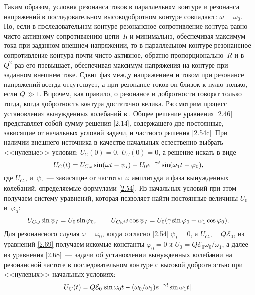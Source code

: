 \documentclass[a4paper,oneside]{book}
\begin{document}
Таким образом, условия резонанса токов в параллельном контуре и резонанса
напряжений в последовательном высокодобротном контуре совпадают:
$\omega=\omega_0$. Но, если в последовательном контуре резонансное сопротивление
контура равно чисто активному сопротивлению цепи~$R$ и минимально, обеспечивая
максимум тока при заданном внешнем напряжении, то в параллельном контуре
резонансное сопротивление контура почти чисто активное, обратно
пропорционально~$R$ и в~$Q^2$ раз его превышает, обеспечивая максимум напряжения
на контуре при заданном внешнем токе. Сдвиг фаз между напряжением и током при
резонансе напряжений всегда отсутствует, а при резонансе токов он близок к нулю
только, если $Q\gg1$. Впрочем, как правило, о резонансе и добротности говорят только тогда, когда добротность контура достаточно велика.
Рассмотрим процесс установления вынужденных колебаний в
. Общее решение уравнения
\eqref{2.46} представляет собой сумму решения \eqref{2.14}, содержащего две
постоянные, зависящие от начальных условий задачи, и частного решения
\eqref{2.54c}. При наличии внешнего источника в качестве начальных естественно
выбрать <<нулевые>> условия: $U_C(0)=0,~\dot U_C(0)=0$, а решение искать в виде
\begin{equation}
	\eqmark{2.68}
	U_C(t)=U_{C\omega}\sin(\omega t-\psi_I)-U_0e^{-\gamma
t}\sin(\omega_1t-\varphi_0),
\end{equation}
где $U_{C\omega}$ и~$\psi_I$~--- зависящие от частоты~$\omega$ амплитуда и фаза
вынужденных колебаний, определяемые формулами \eqref{2.54}. Из начальных условий
при этом получаем систему уравнений, которая позволяет найти постоянные величины
$U_0$ и~$\varphi_0$:
\begin{equation}
	\eqmark{2.69}
	U_{C\omega}\sin\psi_I=U_0\sin\varphi_0, \qquad
U_{C\omega}\omega\cos\psi_I=U_0(\gamma\sin\varphi_0+\omega_1\cos\varphi_0).
\end{equation}
Для резонансного случая $\omega=\omega_0$, когда согласно \eqref{2.54}
$\psi_I=0$, а $U_{C\omega}=Q\mathcal{E}_0$, из уравнений \eqref{2.69} получаем
искомые константы $\varphi_0=0$ и $U_0=Q\mathcal{E}_0\omega_0/\omega_1$, а далее
из уравнения \eqref{2.68}~---  задачи об установлении
вынужденных колебаний на резонансной частоте в последовательном контуре с
высокой добротностью при <<нулевых>> начальных условиях:
\begin{equation}
	\eqmark{2.70}
	U_{C}(t)=Q\mathcal{E}_0[\sin\omega_0t-(\omega_0/\omega_1)e^{-\gamma
t}\sin\omega_1 t].
\end{equation}
\end{document}
